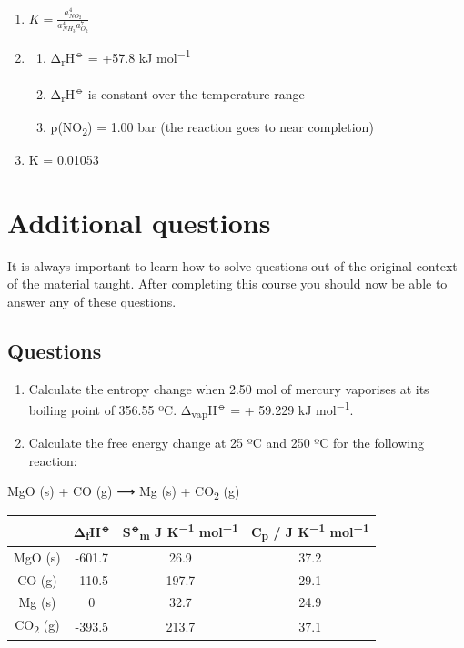 \documentclass[
]{book}
\providecommand{\tightlist}{%
  \setlength{\itemsep}{0pt}\setlength{\parskip}{0pt}}
\begin{document}
\begin{enumerate}
\def\labelenumi{\arabic{enumi}.}
\item
  \(K = \frac{a_{NO_2}^4 }{a_{NH_3}^4 a_{O_2}^7}\)
\item
  \begin{enumerate}
  \def\labelenumii{\alph{enumii}.}
  \tightlist
  \item
    Δ\textsubscript{r}H\textsuperscript{⦵} = +57.8 kJ mol\textsuperscript{−1}
  \item
    Δ\textsubscript{r}H\textsuperscript{⦵} is constant over the temperature range
  \item
    p(NO\textsubscript{2}) = 1.00 bar (the reaction goes to near completion)
  \end{enumerate}
\item
  K = 0.01053
\end{enumerate}

\hypertarget{additional-questions}{%
\chapter{Additional questions}\label{additional-questions}}

It is always important to learn how to solve questions out of the original context of the material taught. After completing this course you should now be able to answer any of these questions.

\hypertarget{questions-3}{%
\section{Questions}\label{questions-3}}

\begin{enumerate}
\def\labelenumi{\arabic{enumi}.}
\item
  Calculate the entropy change when 2.50 mol of mercury vaporises at its boiling point of 356.55 ºC. Δ\textsubscript{vap}H\textsuperscript{⦵} = + 59.229 kJ mol\textsuperscript{−1}.
\item
  Calculate the free energy change at 25 ºC and 250 ºC for the following reaction:
\end{enumerate}

MgO (s) + CO (g) ⟶ Mg (s) + CO\textsubscript{2} (g)

\begin{longtable}[]{@{}cccc@{}}
\toprule
& Δ\textsubscript{f}H\textsuperscript{⦵} & S\textsuperscript{⦵}\textsubscript{m} J K\textsuperscript{−1} mol\textsuperscript{−1} & C\textsubscript{p} / J K\textsuperscript{−1} mol\textsuperscript{−1}\tabularnewline
\midrule
\endhead
MgO (s) & -601.7 & 26.9 & 37.2\tabularnewline
CO (g) & -110.5 & 197.7 & 29.1\tabularnewline
Mg (s) & 0 & 32.7 & 24.9\tabularnewline
CO\textsubscript{2} (g) & -393.5 & 213.7 & 37.1\tabularnewline
\bottomrule
\end{longtable}
\end{document}
